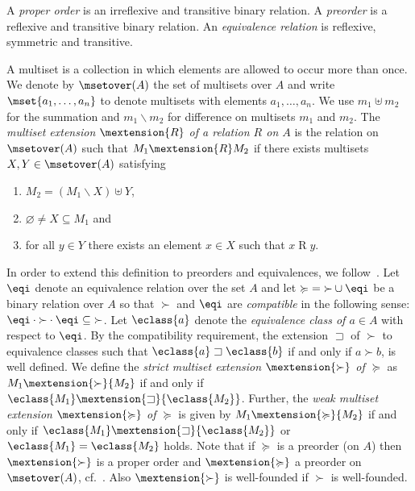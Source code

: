 \documentclass{LMCS}
\begin{document}
A \emph{proper order} is an irreflexive and transitive binary relation.
A \emph{preorder} is a reflexive and transitive binary relation. 
An \emph{equivalence relation} is reflexive, symmetric and transitive.


A multiset is a collection in which elements are allowed to
occur more than once. We denote by $\msetover(A)$ the set of multisets over $A$
and write $\mset{a_1,\dots,a_n}$ to denote multisets with elements $a_1, \dots,a_n$.
We use $m_1 \uplus m_2$ for the summation and $m_1 \backslash m_2$ for difference on multisets $m_1$ and $m_2$.
The \emph{multiset extension} $\mextension{R}$ \emph{of a relation $R$ on $A$} is the 
relation on $\msetover(A)$ such that $M_1 \mextension{R} M_2$ if there exists 
multisets $X,Y \in \msetover(A)$ satisfying 
\begin{enumerate}[labelsep=*,leftmargin=*]    
    \item $M_2 = (M_1 \backslash X) \uplus Y$, 
    \item $\varnothing \not= X \subseteq M_1$ and 
    \item for all $y \in Y$ there exists an element $x \in X$ such that $x \mathrel{R} y$.
\end{enumerate}
In order to extend this definition to preorders and equivalences, we follow~\cite{Ferreira95}.
Let $\eqi$ denote an equivalence relation over the set $A$ and let ${\succcurlyeq} = {\succ} \cup {\eqi}$ be a binary
relation over $A$ so that $\succ$ and $\eqi$ are \emph{compatible} in the following sense: 
${{\eqi} \cdot {\succ} \cdot {\eqi}} \subseteq {{\succ}}$. 
Let $\eclass{a}$ denote the \emph{equivalence class of $a \in A$} with respect to $\eqi$.
By the compatibility requirement, 
the extension $\sqsupset$ of $\succ$ to equivalence classes 
such that $\eclass{a}\sqsupset\eclass{b}$ if and only if $a \succ b$, 
is well defined.
We define the \emph{strict multiset extension $\mextension{\succ}$ of $\succcurlyeq$} as 
${M_1} \mextension{\succ} {M_2}$ if and only if ${\eclass{M_1}} \mextension{\sqsupset} {\eclass{M_2}}$.
Further, the \emph{weak multiset extension $\mextension{\succcurlyeq}$ of $\succcurlyeq$} is given 
by ${M_1} \mextension{\succcurlyeq} {M_2}$ if and only if ${\eclass{M_1}} \mextension{\sqsupset} {\eclass{M_2}}$
or ${\eclass{M_1}} = {\eclass{M_2}}$ holds. 
Note that if ${\succcurlyeq}$ is a preorder (on $A$) then
$\mextension{\succ}$ is a proper order
and $\mextension{\succcurlyeq}$ a preorder on $\msetover(A)$, cf.~\cite{Ferreira95}. 
Also $\mextension{\succ}$ is well-founded if $\succ$ is well-founded. 
\end{document}
